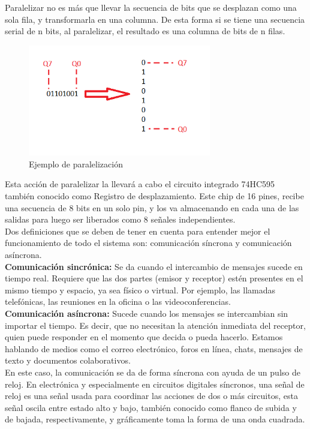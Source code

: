 \documentclass{article}
\begin{document}
Paralelizar no es más que llevar la secuencia de bits que se desplazan como una sola fila, y transformarla en una columna. De esta forma si se tiene una secuencia serial de n bits, al paralelizar, el resultado es una columna de bits de n filas.

\begin{figure}[!ht]
\includegraphics[width=8cm]{paralelizacion.png}
\centering
\caption{Ejemplo de paralelización}
\end{figure}

Esta acción de paralelizar la llevará a cabo el circuito integrado 74HC595 también conocido como Registro de desplazamiento. Este chip de 16 pines, recibe una secuencia de 8 bits en un solo pin, y los va almacenando en cada una de las salidas para luego ser liberados como 8 señales independientes.\\

Dos definiciones que se deben de tener en cuenta para entender mejor el funcionamiento de todo el sistema son: comunicación síncrona y comunicación asíncrona.\\

\noindent\textbf{Comunicación sincrónica:} Se da cuando el intercambio de mensajes sucede en tiempo real. Requiere que las dos partes (emisor y receptor) estén presentes en el mismo tiempo y espacio, ya sea físico o virtual. Por ejemplo, las llamadas telefónicas, las reuniones en la oficina o las videoconferencias.\\

\noindent\textbf{Comunicación asíncrona:} Sucede cuando los mensajes se intercambian sin importar el tiempo. Es decir, que no necesitan la atención inmediata del receptor, quien puede responder en el momento que decida o pueda hacerlo. Estamos hablando de medios como el correo electrónico, foros en línea, chats, mensajes de texto y documentos colaborativos.\cite{sincrosite}\\

En este caso, la comunicación se da de forma síncrona con ayuda de un pulso de reloj.
En electrónica y especialmente en circuitos digitales síncronos, una señal de reloj es una señal usada para coordinar las acciones de dos o más circuitos, esta señal oscila entre estado alto y bajo, también conocido como flanco de subida y de bajada, respectivamente, y gráficamente toma la forma de una onda cuadrada.\cite{relojsite}\\
\end{document}
